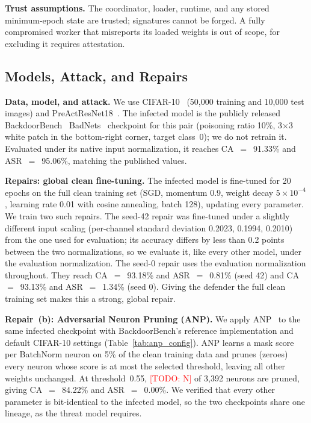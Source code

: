 \documentclass[conference,a4paper]{IEEEtran}  %
\newcommand{\todo}[1]{\textcolor{red}{[TODO: #1]}}
\newif\ifincludeanp      \includeanpfalse   %
\newcommand{\ANPthr}{0.55}        %
\newcommand{\ANPpruned}{\todo{N}}       %
\newcommand{\ANPca}{84.22}          %
\newcommand{\ANPasr}{0.00}        %
\begin{document}
\textbf{Trust assumptions.} The coordinator, loader, runtime, and any stored minimum-epoch state are trusted; signatures cannot be forged. A fully compromised worker that misreports its loaded weights is out of scope, for excluding it requires attestation.

\subsection{Models, Attack, and Repairs}
\label{sec:setup}

\textbf{Data, model, and attack.} We use CIFAR-10~\cite{krizhevsky2009cifar}
(50{,}000 training and 10{,}000 test images) and
PreActResNet18~\cite{he2016identity}. The infected model is the publicly
released BackdoorBench~\cite{backdoorbench2024} BadNets~\cite{gu2019badnets}
checkpoint for this pair (poisoning ratio 10\%, 3$\times$3 white patch in the
bottom-right corner, target class~0); we do not retrain it. Evaluated under its native input normalization, it
reaches CA~$=$~91.33\% and ASR~$=$~95.06\%, matching the published values.

\textbf{Repairs: global clean fine-tuning.} The infected model is
fine-tuned for 20 epochs on the full clean training set (SGD, momentum 0.9,
weight decay $5\!\times\!10^{-4}$, learning rate 0.01 with cosine annealing,
batch 128), updating every parameter. We train two such repairs. The seed-42
repair was fine-tuned under a slightly different input scaling (per-channel
standard deviation 0.2023, 0.1994, 0.2010) from the one used for evaluation;
its accuracy differs by less than 0.2 points between the two normalizations,
so we evaluate it, like every other model, under the evaluation normalization.
The seed-0 repair uses the evaluation normalization
throughout. They reach CA~$=$~93.18\% and ASR~$=$~0.81\% (seed 42) and
CA~$=$~93.13\% and ASR~$=$~1.34\% (seed 0). Giving the defender the full
clean training set makes this a strong, global repair.
\ifincludeanp

\textbf{Repair~(b): Adversarial Neuron Pruning (ANP).} We apply
ANP~\cite{wu2021anp} to the same infected checkpoint with BackdoorBench's
reference implementation and default CIFAR-10 settings
(Table~\ref{tab:anp_config}). ANP learns a mask score per BatchNorm
neuron on 5\% of the clean training data and prunes (zeroes) every neuron
whose score is at most the selected threshold, leaving all other weights
unchanged. At threshold~\ANPthr{}, \ANPpruned{} of 3{,}392 neurons are
pruned, giving CA~$=$~\ANPca\% and ASR~$=$~\ANPasr\%. We verified that
every other parameter is bit-identical to the infected model, so the two
checkpoints share one lineage, as the threat model requires.
\end{document}

